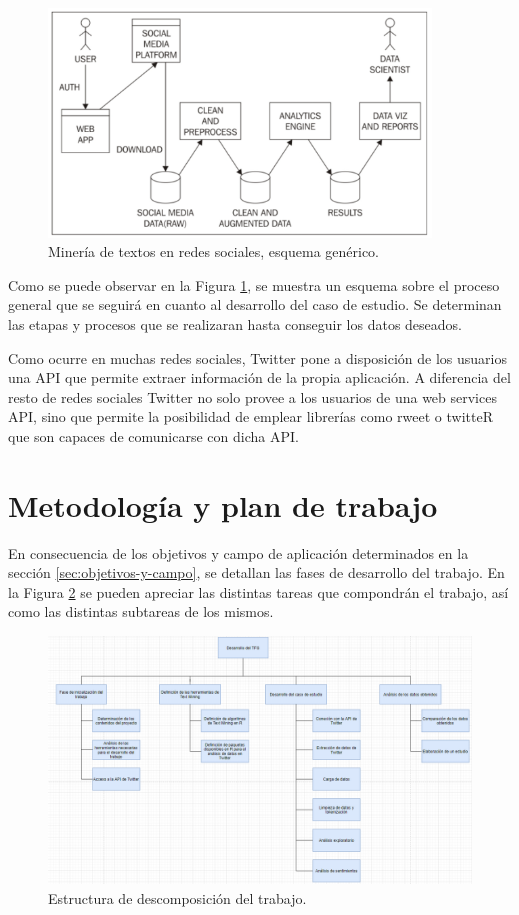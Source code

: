 \begin{figure}[tphb]
  \centering
  \includegraphics[width=4in]{text-mining-diagram.png}
  \caption{Minería de textos en redes sociales, esquema genérico.}
  \label{img:data-mining-process}
\end{figure}

Como se puede observar en la Figura \ref{img:data-mining-process}, se muestra un esquema sobre el proceso 
general que se seguirá en  cuanto al desarrollo del caso de estudio. Se determinan las etapas y procesos que se 
realizaran hasta conseguir los datos deseados.\cite{esquema-text-mining}

Como ocurre en muchas redes sociales, Twitter pone a disposición de los usuarios una API \cite{api-twitter} que
permite extraer información de la propia aplicación. A diferencia del resto de redes sociales Twitter no solo provee a los usuarios 
de una web services API, sino que permite la posibilidad de emplear librerías como rweet o twitteR que son capaces de 
comunicarse con dicha API.

\section{Metodología y plan de trabajo}
\label{sec:metodologia-y-plan}
En consecuencia de los objetivos y campo de aplicación determinados en la sección \ref{sec:objetivos-y-campo},
se detallan las fases de desarrollo del trabajo. En la Figura \ref{img:workdown-diagram} se pueden 
apreciar las distintas tareas que compondrán el trabajo, así como las distintas subtareas de los mismos.

\begin{figure}[tphb]
  \centering
  \includegraphics[width=6in]{breakdown-diagram.png}
  \caption{Estructura de descomposición del trabajo.}
  \label{img:workdown-diagram}
\end{figure}

